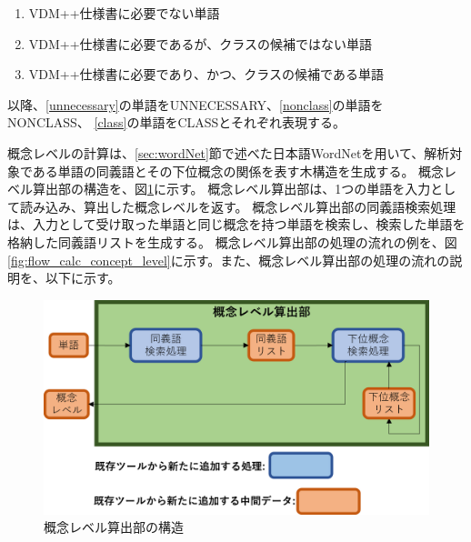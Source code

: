 \begin{enumerate}[label=\textbf{\Alph*}.]
    \item VDM++仕様書に必要でない単語
    \label{unnecessary}
    \item VDM++仕様書に必要であるが、クラスの候補ではない単語
    \label{nonclass}
    \item VDM++仕様書に必要であり、かつ、クラスの候補である単語
    \label{class}
\end{enumerate}

以降、\ref{unnecessary}の単語をUNNECESSARY、\ref{nonclass}の単語をNONCLASS、
\ref{class}の単語をCLASSとそれぞれ表現する。

概念レベルの計算は、\ref{sec:wordNet}節で述べた日本語WordNetを用いて、解析対象である単語の同義語とその下位概念の関係を表す木構造を生成する。
概念レベル算出部の構造を、図\ref{fig:vgml_concept_level_structure}に示す。
概念レベル算出部は、1つの単語を入力として読み込み、算出した概念レベルを返す。
概念レベル算出部の同義語検索処理は、入力として受け取った単語と同じ概念を持つ単語を検索し、検索した単語を格納した同義語リストを生成する。
概念レベル算出部の処理の流れの例を、図\ref{fig:flow_calc_concept_level}に示す。また、概念レベル算出部の処理の流れの説明を、以下に示す。

\begin{figure}[t]
    \begin{center}
        \includegraphics[width=1.0\columnwidth]{image/vgml_concept_level_structure.png}
        \caption{概念レベル算出部の構造}
        \label{fig:vgml_concept_level_structure}
    \end{center}
\end{figure}

